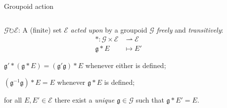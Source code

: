 \documentclass[aspectratio=169]{beamer}
\renewcommand{\a}{\mathfrak{a}}
\renewcommand{\b}{\mathfrak{b}}
\newcommand{\g}{\mathfrak{g}}
\newcommand{\G}{\mathcal{G}}
\newcommand{\E}{\mathcal{E}}
\begin{document}
\begin{frame}{Groupoid action}
  \large
  \begin{columns}
    \begin{column}{0.7\textwidth}
      \emph{$\G\circlearrowright\E$}: A (finite) set $\E$ \emph{acted
        upon} by a groupoid $\G$ \emph{freely} and \emph{transitively}:
      \begin{align*}
        * : \G × \E &\rightharpoonup \E\\
        \g * E &\mapsto E'
      \end{align*}
      \par\begin{description}[labelwidth=0]
      \item[Compatibility:] \emph{$\g' * (\g * E) = (\g'\g)*E$} whenever either is defined;
      \item[Identity:] \emph{$(\g^{-1}\g) * E = E$} whenever $\g * E$ is defined;
      \item[Regularity:] for all $E,E'\in\E$ there exist a \emph{unique
          $\g\in\G$} such that \emph{$\g*E'=E$}.
        \setlength{\itemsep}{2em}
      \end{description}
    \end{column}
    \begin{column}{0.3\textwidth}
      \centering
    \end{column}
  \end{columns}
\end{frame}

\end{document}
